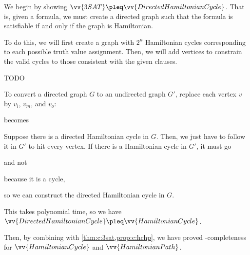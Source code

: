 \begin{prf}
  We begin by showing $\vv{3SAT} \pleq \vv{DirectedHamiltonianCycle}$.
  That is, given a formula, we must create a directed graph
  such that the formula is satisfiable if and only if the graph is Hamiltonian.

  To do this, we will first create a graph with $2^n$ Hamiltonian cycles
  corresponding to each possible truth value assignment.
  Then, we will add vertices to constrain the valid cycles to those
  consistent with the given clauses.

  TODO

  To convert a directed graph $G$ to an undirected graph $G'$,
  replace each vertex $v$ by $v_i$, $v_m$, and $v_o$:
  \begin{center}
    becomes
  \end{center}
  Suppose there is a directed Hamiltonian cycle in $G$.
  Then, we just have to follow it in $G'$ to hit every vertex.
  If there is a Hamiltonian cycle in $G'$, it must go
  \begin{center}
    and not
    because it is a cycle,
  \end{center}
  so we can construct the directed Hamiltonian cycle in $G$.

  This takes polynomial time, so we have $\vv{DirectedHamiltonianCycle} \pleq \vv{HamiltonianCycle}$.
\end{prf}

Then, by combining with \cref{thm:c:3sat,prop:c:hchp},
we have proved \NP-completeness for $\vv{HamiltonianCycle}$ and $\vv{HamiltonianPath}$.
